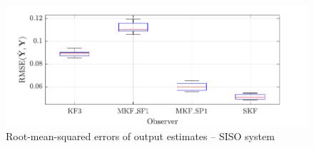 %
%
%

\begin{figure}[htp]
	\centering
	\includegraphics[width=12cm]{images/rod_obs_sim1_all_seed_y_err_box.pdf}
	\caption{Root-mean-squared errors of output estimates – SISO system}
	\label{fig:rod-obs-sim1-yest-all-seed-RMSE-box}
\end{figure}


